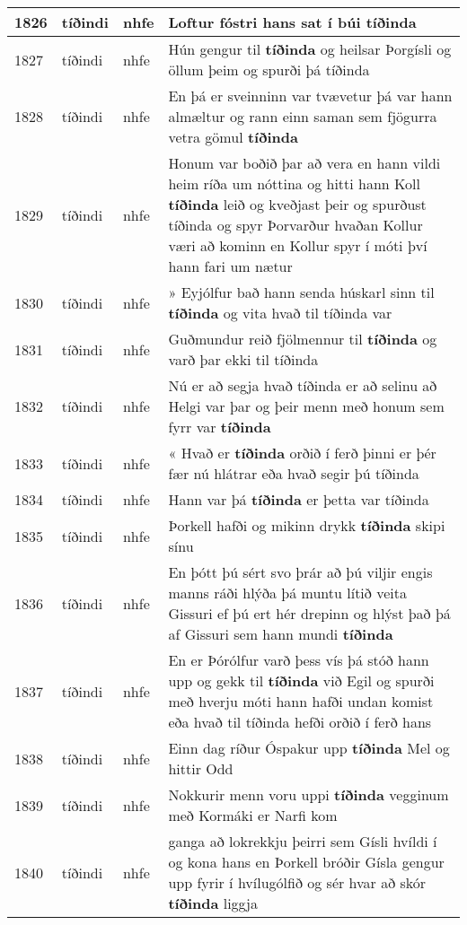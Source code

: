 \documentclass{article}
\begin{document}
\begin{longtable}{p{1cm}|p{1cm}|p{1cm}|p{13cm}}
\hline
1826&tíðindi&nhfe&Loftur fóstri hans sat í búi \textbf{tíðinda} \\
\hline
1827&tíðindi&nhfe&Hún gengur til \textbf{tíðinda} og heilsar Þorgísli og öllum þeim og spurði þá tíðinda\\
\hline
1828&tíðindi&nhfe&En þá er sveinninn var tvævetur þá var hann almæltur og rann einn saman sem fjögurra vetra gömul \textbf{tíðinda} \\
\hline
1829&tíðindi&nhfe&Honum var boðið þar að vera en hann vildi heim ríða um nóttina og hitti hann Koll \textbf{tíðinda} leið og kveðjast þeir og spurðust tíðinda og spyr Þorvarður hvaðan Kollur væri að kominn en Kollur spyr í móti því hann fari um nætur\\
\hline
1830&tíðindi&nhfe&» Eyjólfur bað hann senda húskarl sinn til \textbf{tíðinda} og vita hvað til tíðinda var\\
\hline
1831&tíðindi&nhfe&Guðmundur reið fjölmennur til \textbf{tíðinda} og varð þar ekki til tíðinda\\
\hline
1832&tíðindi&nhfe&Nú er að segja hvað tíðinda er að selinu að Helgi var þar og þeir menn með honum sem fyrr var \textbf{tíðinda} \\
\hline
1833&tíðindi&nhfe&« Hvað er \textbf{tíðinda} orðið í ferð þinni er þér fær nú hlátrar eða hvað segir þú tíðinda\\
\hline
1834&tíðindi&nhfe&Hann var þá \textbf{tíðinda} er þetta var tíðinda\\
\hline
1835&tíðindi&nhfe&Þorkell hafði og mikinn drykk \textbf{tíðinda} skipi sínu\\
\hline
1836&tíðindi&nhfe&En þótt þú sért svo þrár að þú viljir engis manns ráði hlýða þá muntu lítið veita Gissuri ef þú ert hér drepinn og hlýst það þá af Gissuri sem hann mundi \textbf{tíðinda} \\
\hline
1837&tíðindi&nhfe&En er Þórólfur varð þess vís þá stóð hann upp og gekk til \textbf{tíðinda} við Egil og spurði með hverju móti hann hafði undan komist eða hvað til tíðinda hefði orðið í ferð hans\\
\hline
1838&tíðindi&nhfe&Einn dag ríður Óspakur upp \textbf{tíðinda} Mel og hittir Odd\\
\hline
1839&tíðindi&nhfe&Nokkurir menn voru uppi \textbf{tíðinda} vegginum með Kormáki er Narfi kom\\
\hline
1840&tíðindi&nhfe&ganga að lokrekkju þeirri sem Gísli hvíldi í og kona hans en Þorkell bróðir Gísla gengur upp fyrir í hvílugólfið og sér hvar að skór \textbf{tíðinda} liggja\\

\end{longtable}
\end{document}

